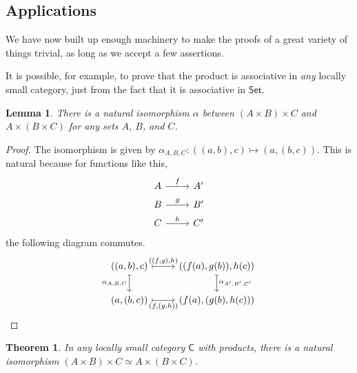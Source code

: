 \documentclass[a4paper]{report}
\theoremstyle{definition}
\theoremstyle{plain}
\newtheorem{theorem}{Theorem}[section]
\newtheorem{lemma}{Lemma}[section]
\theoremstyle{remark}
\begin{document}
\subsection{Applications}
We have now built up enough machinery to make the proofs of a great variety of things trivial, as long as we accept a few assertions. 

It is possible, for example, to prove that the product is associative in \emph{any} locally small category, just from the fact that it is associative in $\mathsf{Set}$.
\begin{lemma}
  There is a natural isomorphism $\alpha$ between $(A \times B) \times C$ and $A \times (B \times C)$ for any sets $A$, $B$, and $C$.
\end{lemma}
\begin{proof}
  The isomorphism is given by $\alpha_{A, B, C}\colon ((a, b), c) \mapsto (a, (b, c))$. This is natural because for functions like this,
  \begin{equation*}
    \begin{tikzcd}[row sep=tiny]
      A 
      \arrow[r, "f"]
      & A'
      \\
      B 
      \arrow[r, "g"]
      & B'
      \\
      C 
      \arrow[r, "h"]
      & C'
    \end{tikzcd}
  \end{equation*}
  the following diagram commutes.
  \begin{equation*}
    \begin{tikzcd}
      ((a, b), c)
      \arrow[r, mapsto, "{((f, g), h)}"]
      \arrow[d, mapsto, swap, "{\alpha_{A, B, C}}"]
      & ((f(a), g(b)), h(c))
      \arrow[d, mapsto, "{\alpha_{A', B', C'}}"]
      \\
      (a, (b, c))
      \arrow[r, mapsto, swap, "{(f, (g, h))}"]
      & (f(a), (g(b), h(c)))
    \end{tikzcd}
  \end{equation*}
\end{proof}
\begin{theorem}
  \label{thm:categoricalproductisassociative}
  In any locally small category $\mathsf{C}$ with products, there is a natural isomorphism $(A \times B) \times C \simeq A \times (B \times C)$.
\end{theorem}
\end{document}
